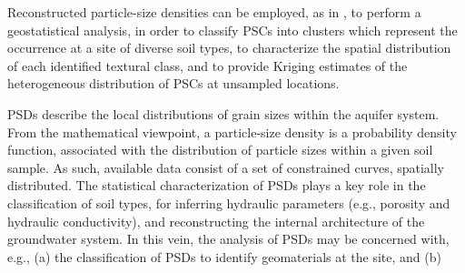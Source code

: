 Reconstructed particle-size densities can be employed, as in \citep{menafoglio:psc}, to perform a geostatistical analysis, in order to classify PSCs into clusters which represent the occurrence at a site of diverse soil types, to characterize the spatial distribution of each identified textural class, and to provide Kriging estimates of the heterogeneous distribution of PSCs at unsampled locations.

PSDs describe the local distributions of grain sizes 
within the aquifer system. From the mathematical viewpoint, a 
particle-size density is a probability density function, associated 
with the distribution of particle sizes within a given soil sample. 
As such, available data consist of a set of constrained curves, spatially distributed. The statistical characterization of PSDs plays a key role in the classification of soil types, for inferring hydraulic parameters (e.g., porosity and hydraulic conductivity), and reconstructing the internal architecture of the groundwater system. In this vein, the analysis of PSDs may be concerned with, e.g., (a) the classification of PSDs to identify geomaterials at the site, and (b) 












